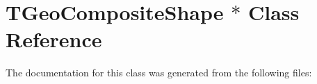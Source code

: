 \hypertarget{class_t_geo_composite_shape_01_5}{
\section{TGeoCompositeShape $\ast$ Class Reference}
\label{class_t_geo_composite_shape_01_5}
}


The documentation for this class was generated from the following files: